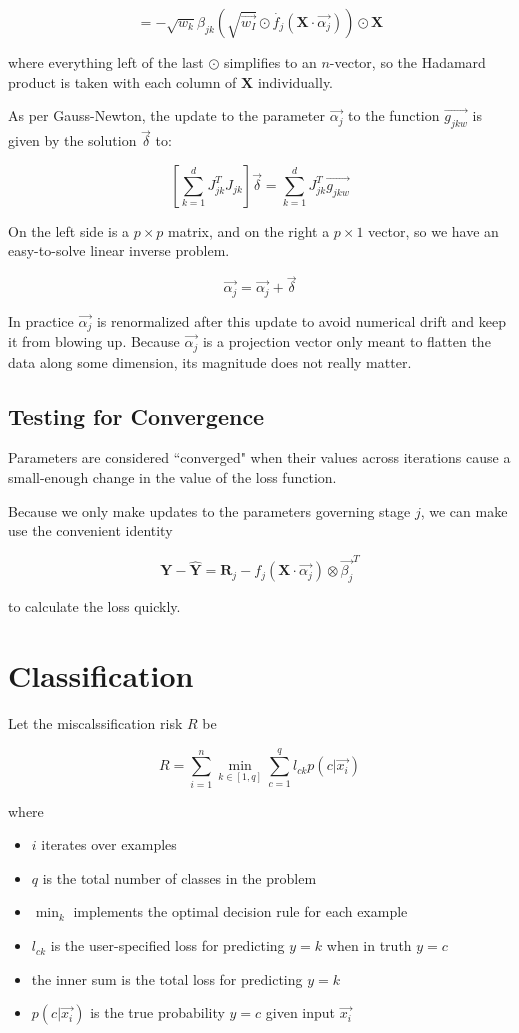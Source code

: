 \documentclass[12pt]{article}
\begin{document}
$$= -\sqrt{w_k} \beta_{jk} (\sqrt{\vec{w_I}} \odot \dot{f_j}(\pmb{X} \cdot \vec{\alpha_j})) \odot \pmb{X}$$

where everything left of the last $\odot$ simplifies to an $n$-vector, so the Hadamard product is taken with each column of $\pmb{X}$ individually.\newline

As per Gauss-Newton, the update to the parameter $\vec{\alpha_j}$ to the function $\vec{g_{jkw}}$ is given by the solution $\vec{\delta}$ to:

$$\left[ \sum_{k=1}^d J_{jk}^T J_{jk} \right] \vec{\delta} = \sum_{k=1}^d J_{jk}^T \vec{g_{jkw}}$$

On the left side is a $p \times p$ matrix, and on the right a $p \times 1$ vector, so we have an easy-to-solve linear inverse problem.

$$ \vec{\alpha_j} = \vec{\alpha_j} + \vec{\delta} $$

In practice $\vec{\alpha_j}$ is renormalized after this update to avoid numerical drift and keep it from blowing up. Because $\vec{\alpha_j}$ is a projection vector only meant to flatten the data along some dimension, its magnitude does not really matter.

\subsection{Testing for Convergence}

Parameters are considered ``converged" when their values across iterations cause a small-enough change in the value of the loss function.

Because we only make updates to the parameters governing stage $j$, we can make use the convenient identity

$$\pmb{Y} - \pmb{\hat{Y}} = \pmb{R}_j - f_j(\pmb{X} \cdot \vec{\alpha_j}) \otimes \vec{\beta_j}^T$$

to calculate the loss quickly.

\section{Classification}

Let the miscalssification risk $R$ be

$$R = \sum_{i=1}^n \min_{k \in [1,q]} \sum_{c=1}^q l_{ck} p(c | \vec{x_i})$$

where
\begin{itemize}
	\setlength\itemsep{-2mm}
	\item $i$ iterates over examples
	\item $q$ is the total number of classes in the problem
	\item $\min_k$ implements the optimal decision rule for each example
	\item $l_{ck}$ is the user-specified loss for predicting $y=k$ when in truth $y=c$
	\item the inner sum is the total loss for predicting $y=k$
	\item $p(c | \vec{x_i})$ is the true probability $y=c$ given input $\vec{x_i}$
\end{itemize}
\end{document}
